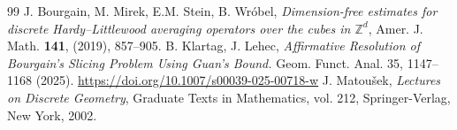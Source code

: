 \documentclass[10pt,a4paper]{amsart}
\numberwithin{equation}{section}
\begin{document}
\begin{thebibliography}{99}
 J. Bourgain, M. Mirek, E.M. Stein, B. Wr\'obel, \textit{Dimension-free estimates for discrete Hardy--Littlewood averaging operators over the cubes in $\mathbb Z^d$}, Amer. J. Math. {\bf 141}, (2019), 857--905.
 B. Klartag, J. Lehec, \textit{Affirmative Resolution of Bourgain’s Slicing Problem Using Guan’s Bound.} Geom. Funct. Anal. 35, 1147–1168 (2025). \url{https://doi.org/10.1007/s00039-025-00718-w}
 J. Matoušek, \textit{Lectures on Discrete Geometry}, Graduate Texts in Mathematics, vol. 212, Springer-Verlag, New York, 2002.
\end{thebibliography}
\end{document}
